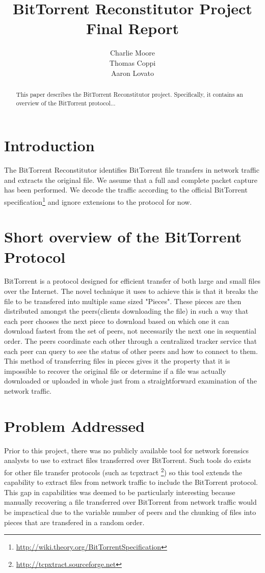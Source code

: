 \documentclass{acm_proc_article-sp}
\author{
  \alignauthor
  Charlie Moore\\
  \email{cmoore@nmt.edu}
  \alignauthor
  Thomas Coppi\\
  \email{tcoppi@nmt.edu}
  \alignauthor
  Aaron Lovato\\
  \email{alovato@nmt.edu}
}
\title{BitTorrent Reconstitutor Project Final Report}
\begin{document}
\maketitle
\begin{abstract}
This paper describes the BitTorrent Reconstitutor project. Specifically, it
contains an overview of the BitTorrent protocol...
\end{abstract}


\section{Introduction}
The BitTorrent Reconstitutor identifies BitTorrent file transfers in network
traffic and extracts the original file.  We assume that a full and complete
packet capture has been performed.  We decode the traffic according to the
official BitTorrent
specification\footnote{\url{http://wiki.theory.org/BitTorrentSpecification}} and
ignore extensions to the protocol for now.

\section{Short overview of the BitTorrent Protocol}
BitTorrent is a protocol designed for efficient transfer of both large and
small files over the Internet. The novel technique it uses to achieve this is
that it breaks the file to be transfered into multiple same sized "Pieces".
These pieces are then distributed amongst the peers(clients downloading the
file) in such a way that each peer chooses the next piece to download based on
which one it can download fastest from the set of peers, not necessarily the
next one in sequential order.  The peers coordinate each other through a
centralized tracker service that each peer can query to see the status of other
peers and how to connect to them.  This method of transferring files in pieces
gives it the property that it is impossible to recover the original file or
determine if a file was actually downloaded or uploaded in whole just from a
straightforward examination of the network traffic.

\section{Problem Addressed}
Prior to this project, there was no publicly available tool for network
forensics analysts to use to extract files transferred over BitTorrent. Such
tools do exists for other file transfer protocols (such as tcpxtract
\footnote{\url{http://tcpxtract.sourceforge.net}}) so this tool extends the
capability to extract files from network traffic to include the BitTorrent
protocol. This gap in capabilities was deemed to be particularly interesting
because manually recovering a file transferred over BitTorrent from network
traffic would be impractical due to the variable number of peers and the
chunking of files into pieces that are transfered in a random order.
\end{document}
